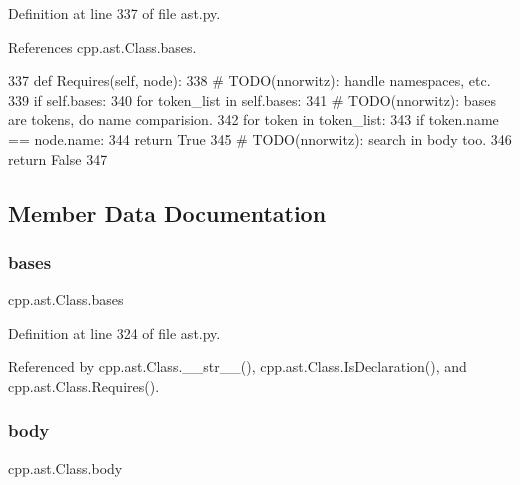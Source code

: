 Definition at line 337 of file ast.\+py.



References cpp.\+ast.\+Class.\+bases.


\begin{DoxyCode}
337     \textcolor{keyword}{def }Requires(self, node):
338         \textcolor{comment}{# TODO(nnorwitz): handle namespaces, etc.}
339         \textcolor{keywordflow}{if} self.bases:
340             \textcolor{keywordflow}{for} token\_list \textcolor{keywordflow}{in} self.bases:
341                 \textcolor{comment}{# TODO(nnorwitz): bases are tokens, do name comparision.}
342                 \textcolor{keywordflow}{for} token \textcolor{keywordflow}{in} token\_list:
343                     \textcolor{keywordflow}{if} token.name == node.name:
344                         \textcolor{keywordflow}{return} \textcolor{keyword}{True}
345         \textcolor{comment}{# TODO(nnorwitz): search in body too.}
346         \textcolor{keywordflow}{return} \textcolor{keyword}{False}
347 
\end{DoxyCode}


\subsection{Member Data Documentation}
\mbox{\label{classcpp_1_1ast_1_1Class_a5665eb67314a075d4e0ff91accbde5d1}} 
\subsubsection{\texorpdfstring{bases}{bases}}
{\footnotesize\ttfamily cpp.\+ast.\+Class.\+bases}



Definition at line 324 of file ast.\+py.



Referenced by cpp.\+ast.\+Class.\+\_\+\+\_\+str\+\_\+\+\_\+(), cpp.\+ast.\+Class.\+Is\+Declaration(), and cpp.\+ast.\+Class.\+Requires().

\mbox{\label{classcpp_1_1ast_1_1Class_add39f61fdcf6dae42d79cac3dcbb7782}} 
\subsubsection{\texorpdfstring{body}{body}}
{\footnotesize\ttfamily cpp.\+ast.\+Class.\+body}



